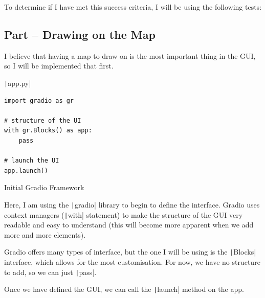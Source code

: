 \documentclass[12pt]{report}
\newcommand{\pil}[1]{\protect\texttt|#1|}
\begin{document}
To determine if I have met this success criteria, I will be using the following tests:

\begin{center}
\end{center}

\subsection{Part \theparts{} -- Drawing on the Map}

I believe that having a map to draw on is the most important thing in the GUI, so I will be implemented that first.

\begin{listing}[H]
\pil{app.py}
\begin{verbatim}
import gradio as gr

# structure of the UI
with gr.Blocks() as app:
    pass

# launch the UI
app.launch()
\end{verbatim}
\caption{Initial Gradio Framework}\label{cs:gradioFramework}
\end{listing}

Here, I am using the \pil{gradio} library to begin to define the interface. Gradio uses context managers (\pil{with} statement) to make the structure of the GUI very readable and easy to understand (this will become more apparent when we add more and more elements).

Gradio offers many types of interface, but the one I will be using is the \pil{Blocks} interface, which allows for the most customisation. For now, we have no structure to add, so we can just \pil{pass}.

Once we have defined the GUI, we can call the \pil{launch} method on the app.
\end{document}
